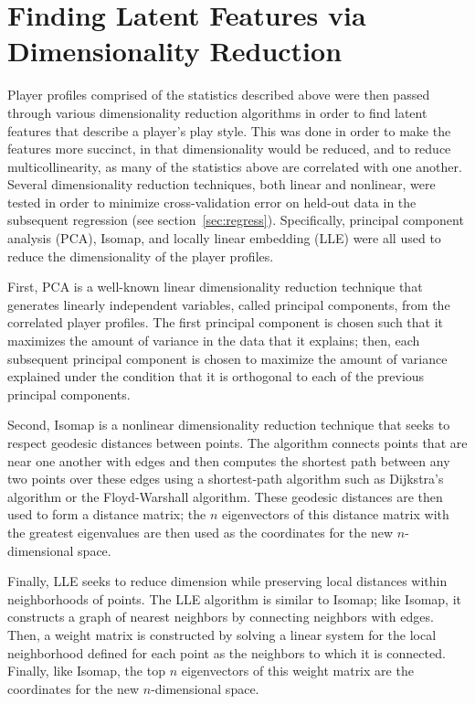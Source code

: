 \section{Finding Latent Features via Dimensionality Reduction}
\label{sec:dim_red}

Player profiles comprised of the statistics described above were then passed through
various dimensionality reduction algorithms in order to find latent features that
describe a player's play style. This was done in order to make the features more
succinct, in that dimensionality would be reduced, and to reduce multicollinearity,
as many of the statistics above are correlated with one another. Several
dimensionality reduction techniques, both linear and nonlinear, were tested in order
to minimize cross-validation error on held-out data in the subsequent regression
(see section~\ref{sec:regress}). Specifically, principal component analysis (PCA),
Isomap, and locally linear embedding (LLE) were all used to reduce the
dimensionality of the player profiles.

First, PCA is a well-known linear dimensionality reduction technique that generates
linearly independent variables, called principal components, from the correlated
player profiles. The first principal component is chosen such that it maximizes the
amount of variance in the data that it explains; then, each subsequent principal
component is chosen to maximize the amount of variance explained under the condition
that it is orthogonal to each of the previous principal components.

Second, Isomap is a nonlinear dimensionality reduction technique that seeks to
respect geodesic distances between points. The algorithm connects points that are
near one another with edges and then computes the shortest path between any two
points over these edges using a shortest-path algorithm such as Dijkstra's algorithm
or the Floyd-Warshall algorithm. These geodesic distances are then used to form a
distance matrix; the $n$ eigenvectors of this distance matrix with the greatest
eigenvalues are then used as the coordinates for the new $n$-dimensional space.

Finally, LLE seeks to reduce dimension while preserving local distances within
neighborhoods of points. The LLE algorithm is similar to Isomap; like Isomap, it
constructs a graph of nearest neighbors by connecting neighbors with edges. Then, a
weight matrix is constructed by solving a linear system for the local neighborhood
defined for each point as the neighbors to which it is connected. Finally, like
Isomap, the top $n$ eigenvectors of this weight matrix are the coordinates for the
new $n$-dimensional space.


